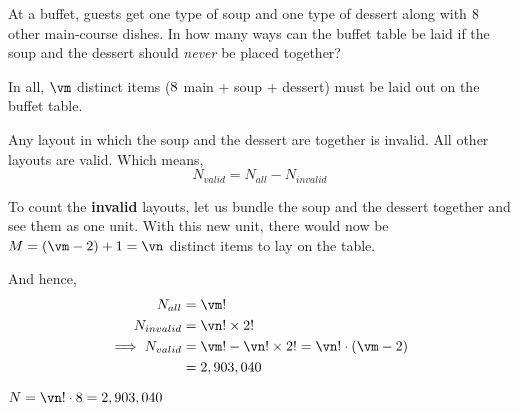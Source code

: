



\ADD{}\vm
\SUBTRACT{}\vn

\question[3] At a buffet, guests get one type of soup and one type of dessert along with $8$ other 
main-course dishes. In how many ways can the buffet table be laid if the soup and the 
dessert should \textit{never} be placed together? 

\watchout

\begin{solution}[\mcq]
  In all, $\vm$ distinct items ($8$ main + soup + dessert)  must be laid 
  out on the buffet table.

  Any layout in which the soup and the dessert are together is invalid. 
  All other layouts are valid. Which means,
  \[ N_{valid} = N_{all} - N_{invalid} \]

  To count the \textbf{invalid} layouts, let us bundle the soup and the dessert together and see them as one unit. 
  With this new unit, there would now be $M = (\vm - 2) + 1 = \vn$ distinct items to lay on the table. 

  And hence, 
  \begin{align}
    N_{all} &= \vm ! \\
    N_{invalid} &= \vn ! \times 2! \\
    \implies N_{valid} &= \vm !- \vn !\times 2! = \vn !\cdot (\vm - 2) \nonumber\\
                       &= \vb
  \end{align}
\end{solution}

\ifprintanswers
  \begin{codex}
    $N = \vn !\cdot \va = \vb$
  \end{codex}
\fi 
